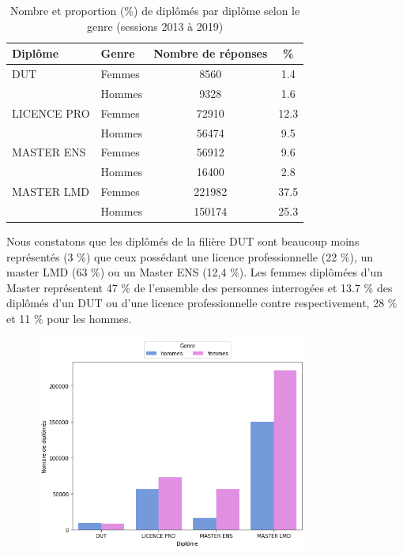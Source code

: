 \documentclass[12pt, a4paper, titlepage, table]{article}
\begin{document}
		\begin{table}[H]
			\centering
			\begin{tabular}{llcc}
				\toprule
				\textbf{Diplôme} & \textbf{Genre} & \textbf{Nombre de réponses} & \textbf{\%} \\
				\midrule
				DUT & Femmes & 8560 & 1.4 \\
				& Hommes & 9328 & 1.6 \\
				\midrule
				LICENCE PRO & Femmes & 72910 & 12.3 \\
				& Hommes & 56474 & 9.5 \\
				\midrule
				MASTER ENS & Femmes & 56912 & 9.6 \\
				& Hommes & 16400 & 2.8 \\
				\midrule
				MASTER LMD & Femmes & 221982 & 37.5 \\
				& Hommes & 150174 & 25.3 \\
				\bottomrule
			\end{tabular}
			\caption{Nombre et proportion (\%) de diplômés par diplôme selon le genre (sessions 2013 à 2019)}
			\label{tab:diplome_genre}
		\end{table}
		
	Nous constatons que les diplômés de la filière DUT sont beaucoup moins représentés (3 \%) que ceux possédant une licence professionnelle (22 \%), un master LMD (63 \%) ou  un Master ENS (12,4 \%). Les femmes diplômées d'un Master représentent 47 \% de l'ensemble des personnes interrogées et 13.7 \% des diplômés d'un DUT ou d'une licence professionnelle contre respectivement, 28 \% et 11 \% pour les hommes.
	
		\begin{figure}[H]
			\centering
			\includegraphics[width=0.8\textwidth]{../graphs/nombre_diplome_genre.png}
			\label{fig:diplome_genre}
		\end{figure}      
\end{document}
